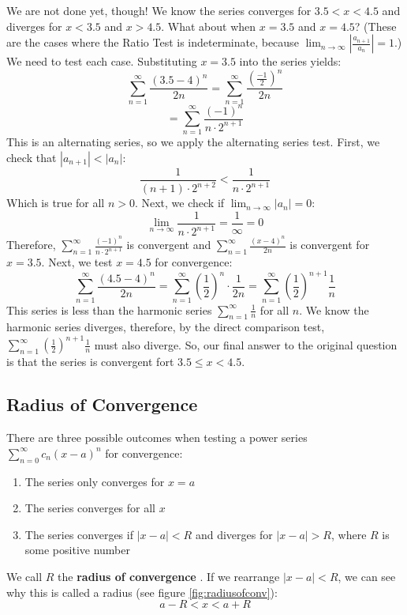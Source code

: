 We are not done yet, though! We know the series converges for $3.5 < x < 4.5$ 
and diverges for $x < 3.5$ and $x > 4.5$. What about when $x = 3.5$ and $x = 
4.5$? (These are the cases where the Ratio Test is indeterminate, because 
$\lim_{n \to \infty} \left| \frac{a_{n+1}}{a_n} \right| = 1$.) We need to test 
each case. Substituting $x = 3.5$ into the series yields:
$$\sum_{n=1}^\infty \frac{(3.5-4)^n}{2n} = \sum_{n=1}^\infty \frac{\left( 
\frac{-1}{2} \right)^n}{2n}$$
$$= \sum_{n=1}^\infty \frac{(-1)^n}{n \cdot 2^{n+1}}$$
This is an alternating series, so we apply the alternating series test. First, 
we check that $|a_{n+1}| < |a_n|$:
$$\frac{1}{(n+1) \cdot 2^{n+2}}  < \frac{1}{n \cdot 2^{n+1}}$$
Which is true for all $n > 0$. Next, we check if $\lim_{n \to \infty} |a_n| = 0$:
$$\lim_{n \to \infty} \frac{1}{n \cdot 2^{n+1}} = \frac{1}{\infty} = 0$$
Therefore, $\sum_{n=1}^\infty \frac{(-1)^n}{n \cdot 2^{n+1}}$ is convergent 
and $\sum_{n=1}^\infty \frac{(x-4)^n}{2n}$ is convergent for $x = 3.5$. Next, we 
test $x=4.5$ for convergence:
$$\sum_{n=1}^\infty \frac{(4.5-4)^n}{2n} = \sum_{n=1}^\infty \left( 
\frac{1}{2} \right)^n \cdot \frac{1}{2n} = \sum_{n=1}^\infty \left( 
\frac{1}{2} \right)^{n+1} \frac{1}{n}$$
This series is less than the harmonic series $\sum_{n=1}^\infty \frac{1}{n}$ 
for all $n$. We know the harmonic series diverges, therefore, by the direct 
comparison test, $\sum_{n=1}^\infty \left( \frac{1}{2} \right)^{n+1} 
\frac{1}{n}$ must also diverge. So, our final answer to the original question 
is that the series is convergent fort $3.5 \leq x < 4.5$. 

\subsection{Radius of Convergence}
There are three possible outcomes when testing a power series $\sum_{n=0}^
\infty c_n (x-a)^n$ for convergence:
\begin{enumerate}
\item The series only converges for $x = a$
\item The series converges for all $x$
\item The series converges if $|x - a| < R$ and diverges for $|x - a| > R$, 
where $R$ is some positive number
\end{enumerate}

We call $R$ the \textbf{radius of convergence} . 
If we rearrange $|x - a| < R$, we can see why this is called a radius (see 
figure \ref{fig:radiusofconv}): 
$$a - R < x < a + R$$

